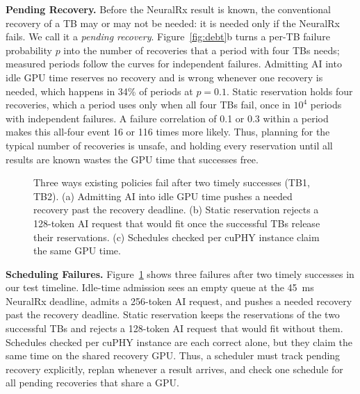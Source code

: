 \documentclass[acmsmall,screen,review,anonymous]{acmart}
\newcommand{\NRx}{NeuralRx\xspace}
\begin{document}
\noindent\textbf{Pending Recovery.}
Before the \NRx result is known, the conventional recovery of a TB may or may not be needed: it is needed
only if the \NRx fails. We call it a \emph{pending recovery}. Figure~\ref{fig:debt}b turns a per-TB failure
probability $p$ into the number of recoveries that a period with four TBs needs; measured periods follow
the curves for independent failures. Admitting AI into idle GPU time reserves no recovery and is wrong
whenever one recovery is needed, which happens in 34\% of periods at $p=0.1$. Static reservation holds
four recoveries, which a period uses only when all four TBs fail, once in $10^4$ periods with
independent failures. A failure correlation of 0.1 or 0.3 within a period makes this all-four event 16 or
116 times more likely. Thus, planning for the typical number of recoveries is unsafe, and holding every
reservation until all results are known wastes the GPU time that successes free.

\begin{figure}[t]
  \centering
  
  \caption{Three ways existing policies fail after two timely successes (TB1, TB2). (a) Admitting AI
  into idle GPU time pushes a needed recovery past the recovery deadline. (b) Static reservation rejects
  a 128-token AI request that would fit once the successful TBs release their reservations. (c)
  Schedules checked per cuPHY instance claim the same GPU time.}
  \label{fig:scheduling-problem}
\end{figure}

\noindent\textbf{Scheduling Failures.}
Figure~\ref{fig:scheduling-problem} shows three failures after two timely successes in our test
timeline. Idle-time admission sees an empty queue at the 45~ms \NRx deadline, admits a 256-token AI
request, and pushes a needed recovery past the recovery deadline. Static reservation keeps the
reservations of the two successful TBs and rejects a 128-token AI request that would fit without them.
Schedules checked per cuPHY instance are each correct alone, but they claim the same time on the shared
recovery GPU. Thus, a scheduler must track pending recovery explicitly, replan whenever a result arrives,
and check one schedule for all pending recoveries that share a GPU.
\end{document}
